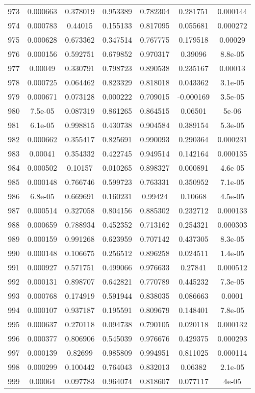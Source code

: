 \begin{table}
\begin{tabular}{c|c|c|c|c|c|c}
973 & 0.000663 & 0.378019 & 0.953389 & 0.782304 & 0.281751 & 0.000144\\
974 & 0.000783 & 0.44015 & 0.155133 & 0.817095 & 0.055681 & 0.000272\\
975 & 0.000628 & 0.673362 & 0.347514 & 0.767775 & 0.179518 & 0.00029\\
976 & 0.000156 & 0.592751 & 0.679852 & 0.970317 & 0.39096 & 8.8e-05\\
977 & 0.00049 & 0.330791 & 0.798723 & 0.890538 & 0.235167 & 0.00013\\
978 & 0.000725 & 0.064462 & 0.823329 & 0.818018 & 0.043362 & 3.1e-05\\
979 & 0.000671 & 0.073128 & 0.000222 & 0.709015 & -0.000169 & 3.5e-05\\
980 & 7.5e-05 & 0.087319 & 0.861265 & 0.864515 & 0.06501 & 5e-06\\
981 & 6.1e-05 & 0.998815 & 0.430738 & 0.904584 & 0.389154 & 5.3e-05\\
982 & 0.000662 & 0.355417 & 0.825691 & 0.990093 & 0.290364 & 0.000231\\
983 & 0.00041 & 0.354332 & 0.422745 & 0.949514 & 0.142164 & 0.000135\\
984 & 0.000502 & 0.10157 & 0.010265 & 0.898327 & 0.000891 & 4.6e-05\\
985 & 0.000148 & 0.766746 & 0.599723 & 0.763331 & 0.350952 & 7.1e-05\\
986 & 6.8e-05 & 0.669691 & 0.160231 & 0.99424 & 0.10668 & 4.5e-05\\
987 & 0.000514 & 0.327058 & 0.804156 & 0.885302 & 0.232712 & 0.000133\\
988 & 0.000659 & 0.788934 & 0.452352 & 0.713162 & 0.254321 & 0.000303\\
989 & 0.000159 & 0.991268 & 0.623959 & 0.707142 & 0.437305 & 8.3e-05\\
990 & 0.000148 & 0.106675 & 0.256512 & 0.896258 & 0.024511 & 1.4e-05\\
991 & 0.000927 & 0.571751 & 0.499066 & 0.976633 & 0.27841 & 0.000512\\
992 & 0.000131 & 0.898707 & 0.642821 & 0.770789 & 0.445232 & 7.3e-05\\
993 & 0.000768 & 0.174919 & 0.591944 & 0.838035 & 0.086663 & 0.0001\\
994 & 0.000107 & 0.937187 & 0.195591 & 0.809679 & 0.148401 & 7.8e-05\\
995 & 0.000637 & 0.270118 & 0.094738 & 0.790105 & 0.020118 & 0.000132\\
996 & 0.000377 & 0.806906 & 0.545039 & 0.976676 & 0.429375 & 0.000293\\
997 & 0.000139 & 0.82699 & 0.985809 & 0.994951 & 0.811025 & 0.000114\\
998 & 0.000299 & 0.100442 & 0.764043 & 0.832013 & 0.06382 & 2.1e-05\\
999 & 0.00064 & 0.097783 & 0.964074 & 0.818607 & 0.077117 & 4e-05\\
\end{tabular}
\end{table}